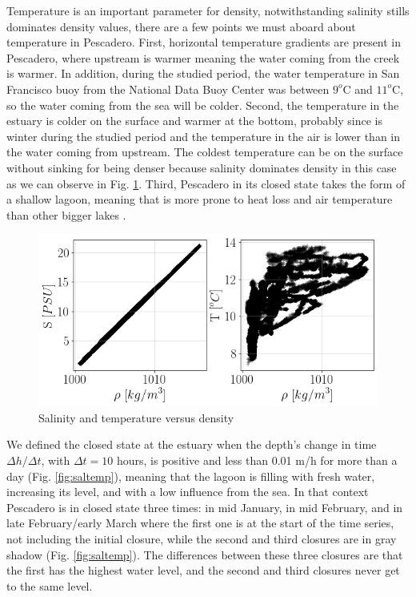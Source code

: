\documentclass[tesis.tex]{subfiles}
\begin{document}
Temperature is an important parameter for density, notwithstanding salinity stills dominates density values, there are a few points we must aboard about temperature in Pescadero. First, horizontal temperature gradients are present in Pescadero, where upstream is warmer meaning the water coming from the creek is warmer. In addition, during the studied period, the water temperature in San Francisco buoy from the National Data Buoy Center was between $9^o$C and $11^o$C, so the water coming from the sea will be colder. Second, the temperature in the estuary is colder on the surface and warmer at the bottom, probably since is winter during the studied period and the temperature in the air is lower than in the water coming from upstream. The coldest temperature can be on the surface without sinking for being denser because salinity dominates density in this case as we can observe in Fig. \ref{fig:saltdens}. Third, Pescadero in its closed state takes the form of a shallow lagoon, meaning that is more prone to heat loss and air temperature than other bigger lakes \citep{peeters2009currents}.\\

\begin{figure}[h!]
  \centering
  \includegraphics[scale=0.5]{Imagenes/salT_dens.png}
  \caption{Salinity and temperature versus density}
  \label{fig:saltdens}
\end{figure}

We defined the closed state at the estuary when the depth's change in time $\Delta h/\Delta t$, with $\Delta t=10$ hours, is positive and less than 0.01 m/h for more than a day (Fig. \ref{fig:saltemp}), meaning that the lagoon is filling with fresh water, increasing its level, and with a low influence from the sea. In that context Pescadero is in closed state three times: in mid January, in mid February, and in late February/early March where the first one is at the start of the time series, not including the initial closure, while the second and third closures are in gray shadow (Fig. \ref{fig:saltemp}). The differences between these three closures are that the first has the highest water level, and the second and third closures never get to the same level. \\
\end{document}
